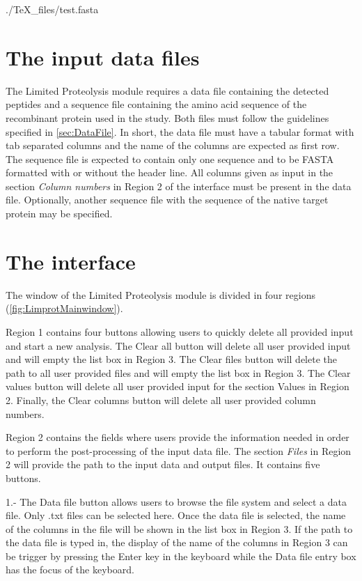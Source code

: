 \begin{texshade}{./TeX_files/test.fasta}
	\hideconsensus
\end{texshade}

\section{The input data files}

The Limited Proteolysis module requires a data file containing the detected peptides and a sequence file containing the amino acid sequence of the recombinant protein used in the study. Both files must follow the guidelines specified in \autoref{sec:DataFile}. In short, the data file must have a tabular format with tab separated columns and the name of the columns are expected as first row. The sequence file is expected to contain only one sequence and to be FASTA formatted with or without the header line. All columns given as input in the section \textit{Column numbers} in Region \num{2} of the interface must be present in the data file. Optionally, another sequence file with the sequence of the native target protein may be specified.

\section{The interface}

The window of the Limited Proteolysis module is divided in four regions (\autoref{fig:LimprotMainwindow}). 

Region \num{1} contains four buttons allowing users to quickly delete all provided input and start a new analysis. The Clear all button will delete all user provided input and will empty the list box in Region \num{3}. The Clear files button will delete the path to all user provided files and will empty the list box in Region \num{3}. The Clear values button will delete all user provided input for the section Values in Region \num{2}. Finally, the Clear columns button will delete all user provided column numbers. 

Region \num{2} contains the fields where users provide the information needed in order to perform the post-processing of the input data file. The section \textit{Files} in Region \num{2} will provide the path to the input data and output files. It contains five buttons. 

\num{1}.- The Data file button allows users to browse the file system and select a data file. Only .txt files can be selected here. Once the data file is selected, the name of the columns in the file will be shown in the list box in Region \num{3}. If the path to the data file is typed in, the display of the name of the columns in Region \num{3} can be trigger by pressing the Enter key in the keyboard while the Data file entry box has the focus of the keyboard.

